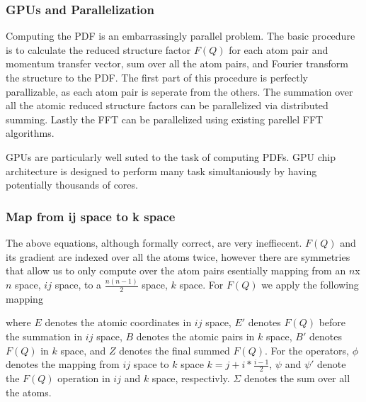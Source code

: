 \subsubsection{GPUs and Parallelization}
Computing the PDF is an embarrassingly parallel problem.
The basic procedure is to calculate the reduced structure factor $F(Q)$ for each atom pair and momentum transfer vector, sum over all the atom pairs, and Fourier transform the structure to the PDF.
The first part of this procedure is perfectly parallizable, as each atom pair is seperate from the others.
The summation over all the atomic reduced structure factors can be parallelized via distributed summing.
Lastly the FFT can be parallelized using existing parellel FFT algorithms.

GPUs are particularly well suted to the task of computing PDFs.
GPU chip architecture is designed to perform many task simultaniously by having potentially thousands of cores.

\subsubsection{Map from ij space to k space}
The above equations, although formally correct, are very ineffiecent. $F(Q)$ and its gradient are indexed over all the atoms twice, however there are symmetries that allow us to only compute over the atom pairs esentially mapping from an $n$x$n$ space, $ij$ space, to a $\frac{n(n-1)}{2}$ space, $k$ space.
For $F(Q)$ we apply the following mapping
\begin{figure}[!ht]
\begin{center}
\end{center}
\end{figure}
where $E$ denotes the atomic coordinates in $ij$ space, $E'$ denotes $F(Q)$ before the summation in $ij$ space, $B$ denotes the atomic pairs in $k$ space, $B'$ denotes $F(Q)$ in $k$ space, and $Z$ denotes the final summed $F(Q)$.  For the operators, $\phi$ denotes the mapping from $ij$ space to $k$ space $k = j + i * \frac{i - 1}{2}$, $\psi$ and $\psi'$ denote the $F(Q)$ operation in $ij$ and $k$ space, respectivly. $\Sigma$ denotes the sum over all the atoms.  


